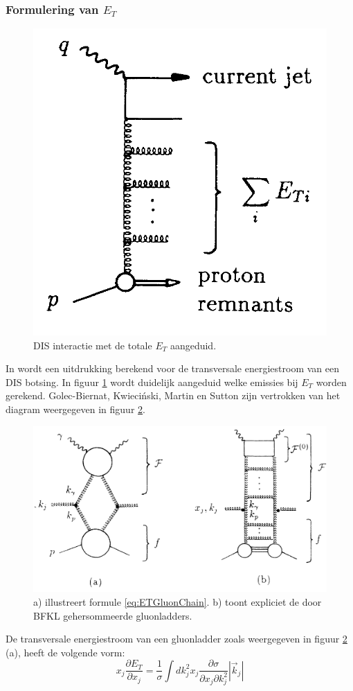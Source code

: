 \documentclass[a4paper,11pt]{article}
\numberwithin{equation}{section} %
\begin{document}
    \subsubsection{Formulering van $E_T$}
\begin{figure} [H]
  \begin{center}
    \includegraphics[width=.33\textwidth]{Afbeeldingen/ETDefinitionDiagram.png}
    \caption{DIS interactie met de totale $E_T$ aangeduid. \cite{ET}}
   \label{fig:ETDefinitionDiagram}
  \end{center}
\end{figure}
In \cite{ET} wordt een uitdrukking berekend voor de transversale energiestroom van een DIS botsing.
In figuur \ref{fig:ETDefinitionDiagram} wordt duidelijk aangeduid welke emissies bij $E_T$ worden gerekend.
Golec-Biernat, Kwieciński, Martin en Sutton zijn vertrokken van het diagram weergegeven in figuur \ref{fig:ETDiagram}.
\begin{figure} [H]
  \begin{center}
    \includegraphics[width=.66\textwidth]{Afbeeldingen/ETDiagram.png}
    \caption{a) illustreert formule \eqref{eq:ETGluonChain}. b) toont expliciet de door BFKL gehersommeerde gluonladders. \cite{ET}}
   \label{fig:ETDiagram}
  \end{center}
\end{figure}
De transversale energiestroom van een gluonladder zoals weergegeven in figuur \ref{fig:ETDiagram} (a), heeft de volgende vorm:
\begin{equation} \label{eq:ETGluonChain}
x_j \frac{\partial E_T}{\partial x_j} = \frac{1}{\sigma} \int dk_j^2 x_j \frac{\partial \sigma}{\partial x_j \partial k_j^2} |\vec{k}_j|
\end{equation}
\end{document}
